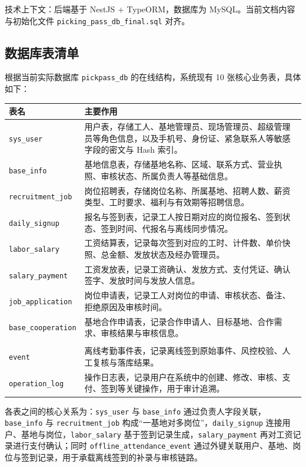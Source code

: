 \documentclass[UTF8,a4paper,fontset=none]{ctexart}
\begin{document}
技术上下文：后端基于 NestJS + TypeORM，数据库为 MySQL。当前文档内容与初始化文件 \texttt{picking\_pass\_db\_final.sql} 对齐。

\subsection{数据库表清单}
根据当前实际数据库 \texttt{pickpass\_db} 的在线结构，系统现有 10 张核心业务表，具体如下：

\begin{tabular}{p{4.2cm}p{9.3cm}}
\toprule
表名 & 主要作用 \\
\midrule
\texttt{sys\_user} & 用户表，存储工人、基地管理员、现场管理员、超级管理员等角色信息，以及手机号、身份证、紧急联系人等敏感字段的密文与 Hash 索引。 \\
\texttt{base\_info} & 基地信息表，存储基地名称、区域、联系方式、营业执照、审核状态、所属负责人等基础信息。 \\
\texttt{recruitment\_job} & 岗位招聘表，存储岗位名称、所属基地、招聘人数、薪资类型、工时要求、福利与有效期等招聘信息。 \\
\texttt{daily\_signup} & 报名与签到表，记录工人按日期对应的岗位报名、签到状态、签到时间、代报名与离线同步情况。 \\
\texttt{labor\_salary} & 工资结算表，记录每次签到对应的工时、计件数、单价快照、总金额、发放状态及经办管理员。 \\
\texttt{salary\_payment} & 工资发放表，记录工资确认、发放方式、支付凭证、确认签字、发放时间与发放人信息。 \\
\texttt{job\_application} & 岗位申请表，记录工人对岗位的申请、审核状态、备注、拒绝原因及审核时间。 \\
\texttt{base\_cooperation} & 基地合作申请表，记录合作申请人、目标基地、合作需求、审核结果与审核信息。 \\
\shortstack[l]{\texttt{offline\_attendance\_}\\\texttt{event}} & 离线考勤事件表，记录离线签到原始事件、风控校验、人工复核与落库结果。 \\
\texttt{operation\_log} & 操作日志表，记录用户在系统中的创建、修改、审核、支付、签到等关键操作，用于审计追溯。 \\
\bottomrule
\end{tabular}

各表之间的核心关系为：\texttt{sys\_user} 与 \texttt{base\_info} 通过负责人字段关联，\texttt{base\_info} 与 \texttt{recruitment\_job} 构成“一基地对多岗位”，\texttt{daily\_signup} 连接用户、基地与岗位，\texttt{labor\_salary} 基于签到记录生成，\texttt{salary\_payment} 再对工资记录进行支付确认；同时 \texttt{offline\_attendance\_event} 通过外键关联用户、基地、岗位与签到记录，用于承载离线签到的补录与审核链路。
\end{document}
